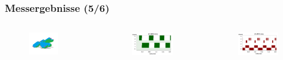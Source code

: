 \documentclass{beamer}
\begin{document}
\begin{frame}
	\frametitle{Messergebnisse (5/6)}
	\begin{columns}
		\begin{figure}
			\includegraphics[width=0.68\textwidth]{img/type3.png} \pause 
		\end{figure}
		\begin{figure}
			\includegraphics[width=0.9\textwidth]{img/hum32.png}
		\end{figure}
		\begin{figure}
			\includegraphics[width=0.9\textwidth]{img/ki3.png} 

\end{figure}
\end{columns}
\end{frame}
\end{document}
